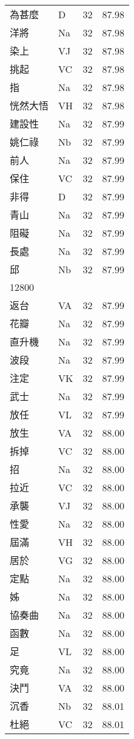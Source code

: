 \documentclass[twocolumn]{book}
\begin{document}
\begin{supertabular}{llrr}
為甚麼 & D & 32 &  87.98\\
洋將 & Na & 32 &  87.98\\
染上 & VJ & 32 &  87.98\\
挑起 & VC & 32 &  87.98\\
指 & Na & 32 &  87.98\\
恍然大悟 & VH & 32 &  87.98\\
建設性 & Na & 32 &  87.99\\
姚仁祿 & Nb & 32 &  87.99\\
前人 & Na & 32 &  87.99\\
保住 & VC & 32 &  87.99\\
非得 & D & 32 &  87.99\\
青山 & Na & 32 &  87.99\\
阻礙 & Na & 32 &  87.99\\
長處 & Na & 32 &  87.99\\
邱 & Nb & 32 &  87.99\\
12800\\
返台 & VA & 32 &  87.99\\
花瓣 & Na & 32 &  87.99\\
直升機 & Na & 32 &  87.99\\
波段 & Na & 32 &  87.99\\
注定 & VK & 32 &  87.99\\
武士 & Na & 32 &  87.99\\
放任 & VL & 32 &  87.99\\
放生 & VA & 32 &  88.00\\
拆掉 & VC & 32 &  88.00\\
招 & Na & 32 &  88.00\\
拉近 & VC & 32 &  88.00\\
承襲 & VJ & 32 &  88.00\\
性愛 & Na & 32 &  88.00\\
屆滿 & VH & 32 &  88.00\\
居於 & VG & 32 &  88.00\\
定點 & Na & 32 &  88.00\\
姊 & Na & 32 &  88.00\\
協奏曲 & Na & 32 &  88.00\\
函數 & Na & 32 &  88.00\\
足 & VL & 32 &  88.00\\
究竟 & Na & 32 &  88.00\\
決鬥 & VA & 32 &  88.00\\
沉香 & Nb & 32 &  88.01\\
杜絕 & VC & 32 &  88.01\\

\end{supertabular}
\end{document}
